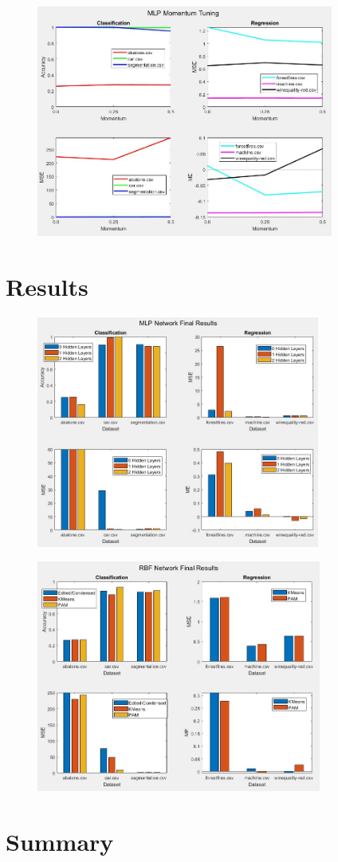 \documentclass[twoside,11pt]{article}
\begin{document}
\begin{figure}[h]
	\centering
	\includegraphics[height=3in]{FINAL_FIGS/MLP_MOMENTUM.JPG}
\end{figure}
\section{Results}
\begin{figure}[h]
	\centering
	\includegraphics[height=3in]{FINAL_FIGS/MLP_FINAL.JPG}
\end{figure}
\begin{figure}[h]
	\centering
	\includegraphics[height=3in]{FINAL_FIGS/RBF_FINAL.JPG}
\end{figure}
\section{Summary}



\end{document}
